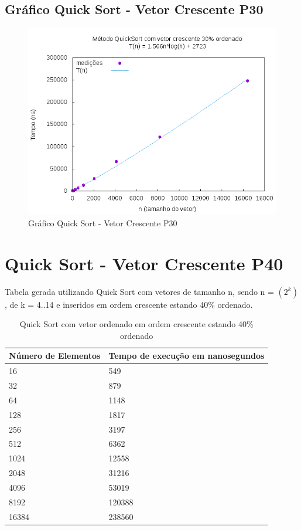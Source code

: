 \documentclass[12pt,a4paper,twoside]{report}
\begin{document}
\subsection{Gráfico Quick Sort - Vetor Crescente P30}
\begin{figure}[H]
    \centering
    \includegraphics[width=0.7\linewidth]{graficos/QuickSort/vIntCrescenteP30/vIntCrescenteP30.png}
  \caption{Gráfico Quick Sort - Vetor Crescente P30}
\end{figure}

\section{Quick Sort - Vetor Crescente P40}
Tabela gerada utilizando Quick Sort com vetores de tamanho n, sendo n = $(2^k)$, de k = 4..14 e inseridos em ordem crescente estando 40\% ordenado.
\begin{table}[H]
\centering
\caption{Quick Sort com vetor ordenado em ordem crescente estando 40\% ordenado}
\label{my-label}
\begin{tabular}{|l|l|}
\hline
\multicolumn{1}{|c|}{\textbf{Número de Elementos}} & \multicolumn{1}{c|}{\textbf{Tempo de execução em nanosegundos}} \\ \hline
16 & 549 \\ \hline
32 & 879 \\ \hline
64 & 1148 \\ \hline
128 & 1817 \\ \hline
256 & 3197 \\ \hline
512 & 6362 \\ \hline
1024 & 12558 \\ \hline
2048 & 31216 \\ \hline
4096 & 53019 \\ \hline
8192 & 120388 \\ \hline
16384 & 238560 \\ \hline
\end{tabular}
\end{table}
\end{document}

